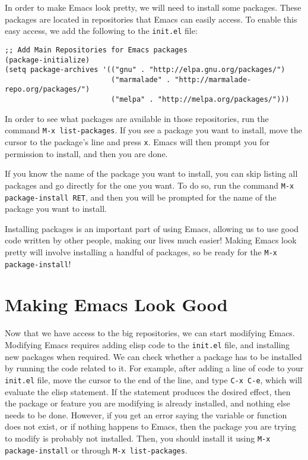 \documentclass[12pt, a4paper]{article}
\begin{document}
In order to make Emacs look pretty, we will need to install some packages. These packages are located in repositories that Emacs can easily access. To enable this easy access, we add the following to the \texttt{init.el} file:

\lstset{language=Lisp,label= ,caption= ,captionpos=b,numbers=none}
\begin{lstlisting}
;; Add Main Repositories for Emacs packages
(package-initialize)
(setq package-archives '(("gnu" . "http://elpa.gnu.org/packages/")
                         ("marmalade" . "http://marmalade-repo.org/packages/")
                         ("melpa" . "http://melpa.org/packages/")))
\end{lstlisting}

In order to see what packages are available in those repositories, run the command \texttt{M-x list-packages}. If you see a package you want to install, move the cursor to the package's line and press \texttt{x}. Emacs will then prompt you for permission to install, and then you are done.

If you know the name of the package you want to install, you can skip listing all packages and go directly for the one you want. To do so, run the command \texttt{M-x package-install RET}, and then you will be prompted for the name of the package you want to install.

Installing packages is an important part of using Emacs, allowing us to use good code written by other people, making our lives much easier! Making Emacs look pretty will involve installing a handful of packages, so be ready for the \texttt{M-x package-install}!

\section{Making Emacs Look Good}
\label{sec:org33ea5e8}

Now that we have access to the big repositories, we can start modifying Emacs. Modifying Emacs requires adding elisp code to the \texttt{init.el} file, and installing new packages when required. We can check whether a package has to be installed by running the code related to it. For example, after adding a line of code to your \texttt{init.el} file, move the cursor to the end of the line, and type \texttt{C-x C-e}, which will evaluate the elisp statement. If the statement produces the desired effect, then the package or feature you are modifying is already installed, and nothing else needs to be done. However, if you get an error saying the variable or function does not exist, or if nothing happens to Emacs, then the package you are trying to modify is probably not installed. Then, you should install it using \texttt{M-x package-install} or through \texttt{M-x list-packages}.
\end{document}
